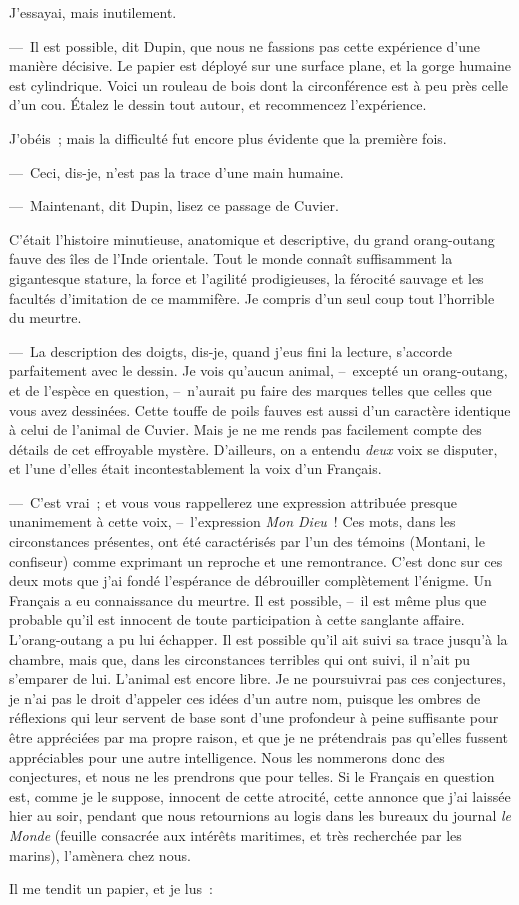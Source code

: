 \documentclass[french,twoside]{book} %
\begin{document}
J’essayai, mais inutilement.\par
— Il est possible, dit Dupin, que nous ne fassions pas cette expérience d’une manière décisive. Le papier est déployé sur une surface plane, et la gorge humaine est cylindrique. Voici un rouleau de bois dont la circonférence est à peu près celle d’un cou. Étalez le dessin tout autour, et recommencez l’expérience.\par
J’obéis ; mais la difficulté fut encore plus évidente que la première fois.\par
— Ceci, dis-je, n’est pas la trace d’une main humaine.\par
— Maintenant, dit Dupin, lisez ce passage de Cuvier.\par
C’était l’histoire minutieuse, anatomique et descriptive, du grand orang-outang fauve des îles de l’Inde orientale. Tout le monde connaît suffisamment la gigantesque stature, la force et l’agilité prodigieuses, la férocité sauvage et les facultés d’imitation de ce mammifère. Je compris d’un seul coup tout l’horrible du meurtre.\par
— La description des doigts, dis-je, quand j’eus fini la lecture, s’accorde parfaitement avec le dessin. Je vois qu’aucun animal, – excepté un orang-outang, et de l’espèce en question, – n’aurait pu faire des marques telles que celles que vous avez dessinées. Cette touffe de poils fauves est aussi d’un caractère identique à celui de l’animal de Cuvier. Mais je ne me rends pas facilement compte des détails de cet effroyable mystère. D’ailleurs, on a entendu \emph{deux} voix se disputer, et l’une d’elles était incontestablement la voix d’un Français.\par
— C’est vrai ; et vous vous rappellerez une expression attribuée presque unanimement à cette voix, – l’expression \emph{Mon Dieu} ! Ces mots, dans les circonstances présentes, ont été caractérisés par l’un des témoins (Montani, le confiseur) comme exprimant un reproche et une remontrance. C’est donc sur ces deux mots que j’ai fondé l’espérance de débrouiller complètement l’énigme. Un Français a eu connaissance du meurtre. Il est possible, – il est même plus que probable qu’il est innocent de toute participation à cette sanglante affaire. L’orang-outang a pu lui échapper. Il est possible qu’il ait suivi sa trace jusqu’à la chambre, mais que, dans les circonstances terribles qui ont suivi, il n’ait pu s’emparer de lui. L’animal est encore libre. Je ne poursuivrai pas ces conjectures, je n’ai pas le droit d’appeler ces idées d’un autre nom, puisque les ombres de réflexions qui leur servent de base sont d’une profondeur à peine suffisante pour être appréciées par ma propre raison, et que je ne prétendrais pas qu’elles fussent appréciables pour une autre intelligence. Nous les nommerons donc des conjectures, et nous ne les prendrons que pour telles. Si le Français en question est, comme je le suppose, innocent de cette atrocité, cette annonce que j’ai laissée hier au soir, pendant que nous retournions au logis dans les bureaux du journal \emph{le Monde} (feuille consacrée aux intérêts maritimes, et très recherchée par les marins), l’amènera chez nous.\par
Il me tendit un papier, et je lus :\par
\end{document}
